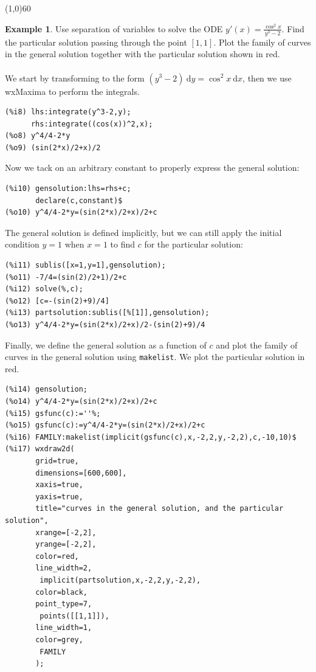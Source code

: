 \documentclass[10.5pt,twoside]{report}
\theoremstyle{definition}
\newtheorem{exmp}{Example}[section]
\begin{document}
\line(1,0){60}
\linethickness{0.5mm}

\begin{exmp} Use separation of variables to solve the ODE $y'(x)=\displaystyle \frac{\cos^2{x}}{y^3-2}$.  Find the particular solution passing through the point $[1,1]$.  Plot the family of curves in the general solution together with the particular solution shown in red.\\
${}$\\
We start by transforming to the form $(y^3-2)\ \mathrm{d}y = \cos^2{x}\ \mathrm{d}x$, then we use wxMaxima to perform the integrals.

\begin{verbatim}
(%i8) lhs:integrate(y^3-2,y);
      rhs:integrate((cos(x))^2,x);
(%o8) y^4/4-2*y
(%o9) (sin(2*x)/2+x)/2
\end{verbatim}

Now we tack on an arbitrary constant to properly express the general solution:

\begin{verbatim}
(%i10) gensolution:lhs=rhs+c;
       declare(c,constant)$
(%o10) y^4/4-2*y=(sin(2*x)/2+x)/2+c
\end{verbatim}

The general solution is defined implicitly, but we can still apply the initial condition $y=1$ when $x=1$ to find $c$ for the particular solution:

\begin{verbatim}
(%i11) sublis([x=1,y=1],gensolution);
(%o11) -7/4=(sin(2)/2+1)/2+c
(%i12) solve(%,c);
(%o12) [c=-(sin(2)+9)/4]
(%i13) partsolution:sublis([%[1]],gensolution);
(%o13) y^4/4-2*y=(sin(2*x)/2+x)/2-(sin(2)+9)/4
\end{verbatim}

Finally, we define the general solution as a function of $c$ and plot the family of curves in the general solution using \verb|makelist|.  We plot the particular solution in red.

\begin{verbatim}
(%i14) gensolution;
(%o14) y^4/4-2*y=(sin(2*x)/2+x)/2+c
(%i15) gsfunc(c):=''%;
(%o15) gsfunc(c):=y^4/4-2*y=(sin(2*x)/2+x)/2+c
(%i16) FAMILY:makelist(implicit(gsfunc(c),x,-2,2,y,-2,2),c,-10,10)$
(%i17) wxdraw2d(
       grid=true,
       dimensions=[600,600],
       xaxis=true,
       yaxis=true,
       title="curves in the general solution, and the particular solution",
       xrange=[-2,2],
       yrange=[-2,2],
       color=red,
       line_width=2,
        implicit(partsolution,x,-2,2,y,-2,2),
       color=black,
       point_type=7,
        points([[1,1]]),
       line_width=1,
       color=grey,
        FAMILY
       );
\end{verbatim}



\end{exmp}
\end{document}
